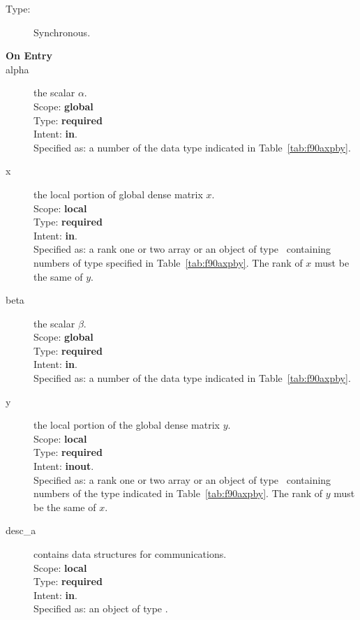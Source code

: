 \begin{description}
\item[Type:] Synchronous.
\item[\bf On Entry]
\item[alpha] the scalar $\alpha$.\\ Scope: {\bf global} \\ Type: {\bf
required} \\ Intent: {\bf in}.\\ Specified as: a number of the data
type indicated in Table~\ref{tab:f90axpby}.
\item[x] the local portion of global dense matrix
$x$.\\
Scope: {\bf local} \\
Type: {\bf required} \\
Intent: {\bf in}.\\
Specified as: a rank one or two array or an object of type \vdata\
containing numbers of type
specified in Table~\ref{tab:f90axpby}.  The rank of $x$ must be the same of $y$.
\item[beta] the scalar $\beta$.\\
Scope: {\bf global} \\
Type: {\bf required} \\
Intent: {\bf in}.\\
Specified as: a number of the data type indicated in Table~\ref{tab:f90axpby}.
\item[y] the local portion of the global dense matrix
$y$. \\
Scope: {\bf local} \\
Type: {\bf required} \\
Intent: {\bf inout}.\\
Specified as:  a rank one or two array or an object of type \vdata\  containing numbers of the type
indicated in Table~\ref{tab:f90axpby}.  The rank of $y$ must be the same of $x$.
\item[desc\_a] contains data structures for communications.\\
Scope: {\bf local} \\
Type: {\bf required}\\
Intent: {\bf in}.\\
Specified as: an object of type \descdata.

\end{description}
